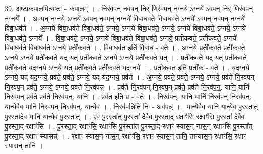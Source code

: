 \documentclass[17pt]{extarticle}
\begin{document}
39. अ॒ष्टाक॑पाल॒मित्य॒ष्टा - क॒पा॒ल॒म् । . निर॑वपन् नवप॒न् निर् णिर॑वपन् न॒ग्नये॒ ऽग्नये॑ ऽवप॒न् निर् णिर॑वपन् न॒ग्नये᳚ । . अ॒व॒प॒न् न॒ग्नये॒ ऽग्नये॑ ऽवपन् नवपन् न॒ग्नये॑ विबा॒धव॑ते विबा॒धव॑ते॒ ऽग्नये॑ ऽवपन् नवपन् न॒ग्नये॑ विबा॒धव॑ते । . अ॒ग्नये॑ विबा॒धव॑ते विबा॒धव॑ते॒ ऽग्नये॒ ऽग्नये॑ विबा॒धव॑ते॒ ऽग्नये॒ ऽग्नये॑ विबा॒धव॑ते॒ ऽग्नये॒ ऽग्नये॑ विबा॒धव॑ते॒ ऽग्नये᳚ । . वि॒बा॒धव॑ते॒ ऽग्नये॒ ऽग्नये॑ विबा॒धव॑ते विबा॒धव॑ते॒ ऽग्नये॒ प्रती॑कवते॒ प्रती॑कवते॒ ऽग्नये॑ विबा॒धव॑ते विबा॒धव॑ते॒ ऽग्नये॒ प्रती॑कवते । . वि॒बा॒धव॑त॒ इति॑ विबा॒ध - व॒ते॒ । . अ॒ग्नये॒ प्रती॑कवते॒ प्रती॑कवते॒ ऽग्नये॒ ऽग्नये॒ प्रती॑कवते॒ यद् यत् प्रती॑कवते॒ ऽग्नये॒ ऽग्नये॒ प्रती॑कवते॒ यत् । . प्रती॑कवते॒ यद् यत् प्रती॑कवते॒ प्रती॑कवते॒ यद॒ग्नये॒ ऽग्नये॒ यत् प्रती॑कवते॒ प्रती॑कवते॒ यद॒ग्नये᳚ । . प्रती॑कवत॒ इति॒ प्रती॑क - व॒ते॒ । . यद॒ग्नये॒ ऽग्नये॒ यद् यद॒ग्नये॒ प्रव॑ते॒ प्रव॑ते॒ ऽग्नये॒ यद् यद॒ग्नये॒ प्रव॑ते । . अ॒ग्नये॒ प्रव॑ते॒ प्रव॑ते॒ ऽग्नये॒ ऽग्नये॒ प्रव॑ते नि॒रव॑पन् नि॒रव॑प॒न् प्रव॑ते॒ ऽग्नये॒ ऽग्नये॒ प्रव॑ते नि॒रव॑पन्न् । . प्रव॑ते नि॒रव॑पन् नि॒रव॑प॒न् प्रव॑ते॒ प्रव॑ते नि॒रव॑प॒न्॒. यानि॒ यानि॑ नि॒रव॑प॒न् प्रव॑ते॒ प्रव॑ते नि॒रव॑प॒न्॒. यानि॑ । . प्रव॑त॒ इति॒ प्र - व॒ते॒ । . नि॒रव॑प॒न्॒. यानि॒ यानि॑ नि॒रव॑पन् नि॒रव॑प॒न्॒. यान्ये॒वैव यानि॑ नि॒रव॑पन् नि॒रव॑प॒न्॒. यान्ये॒व । . नि॒रव॑प॒न्निति॑ निः - अव॑पन्न् । . यान्ये॒वैव यानि॒ यान्ये॒व पु॒रस्ता᳚त् पु॒रस्ता॑दे॒व यानि॒ यान्ये॒व पु॒रस्ता᳚त् । . ए॒व पु॒रस्ता᳚त् पु॒रस्ता॑ दे॒वैव पु॒रस्ता॒द् रक्षाꣳ॑सि॒ रक्षाꣳ॑सि पु॒रस्ता॑ दे॒वैव पु॒रस्ता॒द् रक्षाꣳ॑सि । . पु॒रस्ता॒द् रक्षाꣳ॑सि॒ रक्षाꣳ॑सि पु॒रस्ता᳚त् पु॒रस्ता॒द् रक्षाꣳ॒॒ स्यास॒न् नास॒न् रक्षाꣳ॑सि पु॒रस्ता᳚त् पु॒रस्ता॒द् रक्षाꣳ॒॒ स्यासन्न्॑ । . रक्षाꣳ॒॒ स्यास॒न् नास॒न् रक्षाꣳ॑सि॒ रक्षाꣳ॒॒ स्यास॒न् तानि॒ तान्यास॒न् रक्षाꣳ॑सि॒ रक्षाꣳ॒॒ स्यास॒न् तानि॑ । \newline
\pagebreak
{}
\end{document}
